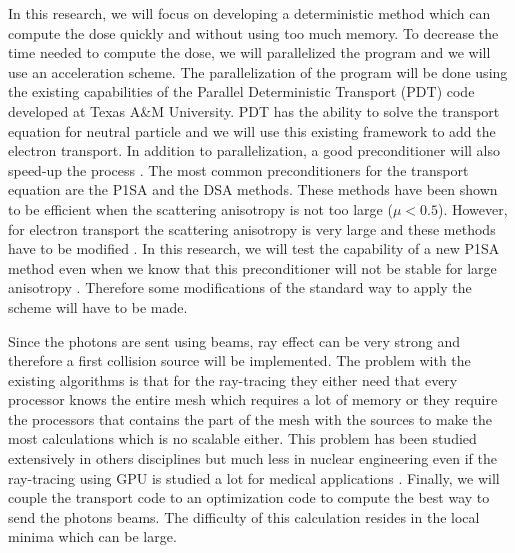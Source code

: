 In this research, we will focus on developing a deterministic method which 
can compute the dose quickly and without using too much memory. To 
decrease the time needed to compute the dose, we will parallelized the program 
and we will use an acceleration scheme. The parallelization of the program will 
be done using the existing capabilities of the Parallel Deterministic Transport 
(PDT) code developed at Texas A\&M University. PDT has the ability to solve the 
transport equation for neutral particle and we will use this existing framework to 
add the electron transport. In addition to parallelization, a good preconditioner 
will also speed-up the process \cite{adams}. The most common preconditioners for the
transport equation are the P1SA and the DSA methods. These methods have been shown
to be efficient when the scattering anisotropy is not too large ($\mu < 0.5$). 
However, for electron transport the scattering anisotropy is very large and these 
methods have to be modified \cite{russe,multisweep}. In this research, we will
test the capability of a new P1SA method even when we know that this preconditioner
will not be stable for large anisotropy \cite{multisweep}. Therefore some
modifications of the standard way to apply the scheme will have to be made.

Since the photons are sent using beams,
ray effect can be very strong and therefore a first collision source will be
implemented. The problem with the existing algorithms is that for the
ray-tracing they either need that every processor knows the entire mesh which
requires a lot of memory or they require the processors that contains the part
of the mesh with the sources
to make the most calculations which is no scalable either. This problem has
been studied extensively in others disciplines \cite{progressive, data} but much less 
in nuclear engineering even if the ray-tracing using GPU is studied a lot for
medical applications \cite{gpu}. Finally, we will couple the transport code to
an optimization code to compute the best way to send the photons beams. The 
difficulty of this calculation resides in the local minima which can be large.

